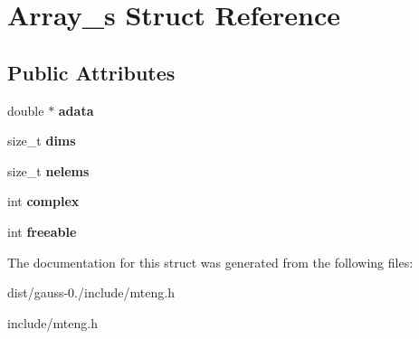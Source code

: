 \hypertarget{struct_array__s}{\section{Array\-\_\-s Struct Reference}
\label{struct_array__s}
}
\subsection*{Public Attributes}
\begin{DoxyCompactItemize}
\item 
\hypertarget{struct_array__s_a1a852c96875eaa77d6ee56d5125e4a72}{double $\ast$ {\bfseries adata}}\label{struct_array__s_a1a852c96875eaa77d6ee56d5125e4a72}

\item 
\hypertarget{struct_array__s_a1a1126df94a6efee708f8209c10f3496}{size\-\_\-t {\bfseries dims}}\label{struct_array__s_a1a1126df94a6efee708f8209c10f3496}

\item 
\hypertarget{struct_array__s_a6dae1a0c2befb95845cba45203d29082}{size\-\_\-t {\bfseries nelems}}\label{struct_array__s_a6dae1a0c2befb95845cba45203d29082}

\item 
\hypertarget{struct_array__s_a26bdb956f658739e64fcef9d024c6d98}{int {\bfseries complex}}\label{struct_array__s_a26bdb956f658739e64fcef9d024c6d98}

\item 
\hypertarget{struct_array__s_ae9a4e603a5d55edd245b5b679ad7d518}{int {\bfseries freeable}}\label{struct_array__s_ae9a4e603a5d55edd245b5b679ad7d518}

\end{DoxyCompactItemize}


The documentation for this struct was generated from the following files\-:\begin{DoxyCompactItemize}
\item 
dist/gauss-\/0./include/mteng.\-h\item 
include/mteng.\-h\end{DoxyCompactItemize}
